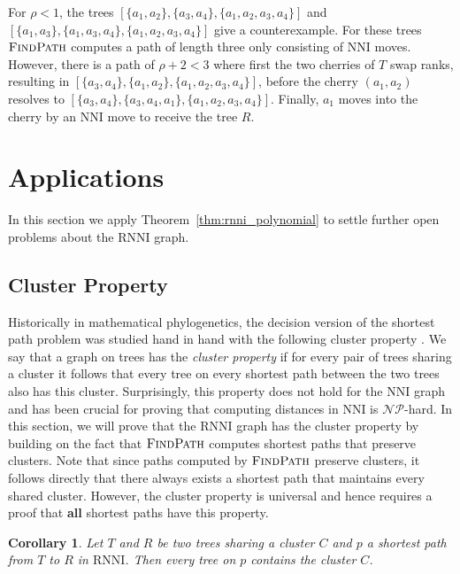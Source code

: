 \documentclass[11pt]{amsart}
\newtheorem{corollary}{Corollary}
\newcommand{\rnni}{\mathrm{RNNI}}
\newcommand{\findpath}{\textsc{FindPath}}
\newcommand{\nni}{\mathrm{NNI}}
\newcommand{\np}{\mathcal{NP}}
\newcommand{\summary}[1]{} %
\begin{document}
For $\rho < 1$, the trees $[\{a_1,a_2\},\{a_3,a_4\},\{a_1,a_2,a_3,a_4\}]$ and $[\{a_1,a_3\},\{a_1,a_3, a_4\},\{a_1,a_2,a_3,a_4\}]$ give a counterexample.
For these trees $\findpath$ computes a path of length three only consisting of $\nni$ moves.
However, there is a path of $\rho + 2 < 3$ where first the two cherries of $T$ swap ranks, resulting in $[\{a_3,a_4\},\{a_1,a_2\},\{a_1,a_2,a_3,a_4\}]$, before the cherry $(a_1,a_2)$ resolves to $[\{a_3,a_4\},\{a_3,a_4,a_1\},\{a_1,a_2,a_3,a_4\}]$.
Finally, $a_1$ moves into the cherry by an $\nni$ move to receive the tree $R$.
\endproof


\section{Applications}

In this section we apply Theorem~\ref{thm:rnni_polynomial} to settle further open problems about the $\rnni$ graph.

\subsection{Cluster Property}

\summary{Some words on the cluster property}
Historically in mathematical phylogenetics, the decision version of the shortest path problem was studied hand in hand with the following cluster property \autocite{Dasgupta2000-xa}.
We say that a graph on trees has the \emph{cluster property} if for every pair of trees sharing a cluster it follows that every tree on every shortest path between the two trees also has this cluster.
Surprisingly, this property does not hold for the $\nni$ graph \autocite{Li1996-zw} and has been crucial for proving \autocite{Dasgupta2000-xa} that computing distances in $\nni$ is $\np$-hard.
In this section, we will prove that the $\rnni$ graph has the cluster property by building on the fact that $\findpath$ computes shortest paths that preserve clusters.
Note that since paths computed by $\findpath$ preserve clusters, it follows directly that there always exists a shortest path that maintains every shared cluster.
However, the cluster property is universal and hence requires a proof that \textbf{all} shortest paths have this property.

\summary{Proving the Cluster Property for $\rnni$}

\begin{corollary}
Let $T$ and $R$ be two trees sharing a cluster $C$ and $p$ a shortest path from $T$ to $R$ in $\rnni$.
Then every tree on $p$ contains the cluster $C$.
\label{cluster_thm}
\end{corollary}
\end{document}
